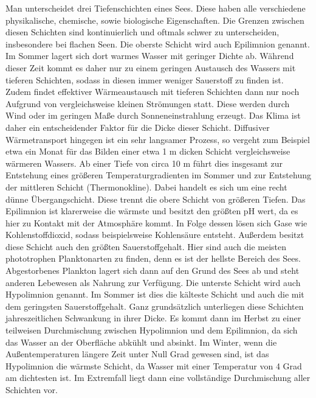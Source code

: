\documentclass[12pt,a4paper,titlepage,headinclude,bibtotoc]{scrartcl}
\begin{document}
Man unterscheidet drei Tiefenschichten eines Sees.
Diese haben alle verschiedene physikalische, chemische, sowie biologische Eigenschaften. Die Grenzen zwischen diesen Schichten sind kontinuierlich und oftmals schwer zu unterscheiden, insbesondere bei flachen Seen.
Die oberste Schicht wird auch Epilimnion genannt. 
Im Sommer lagert sich dort warmes Wasser mit geringer Dichte ab.
Während dieser Zeit kommt es daher nur zu einem geringen Austausch des Wassers
mit tieferen Schichten, sodass in diesen immer weniger Sauerstoff zu finden ist.
Zudem findet effektiver Wärmeaustausch mit tieferen Schichten dann nur noch Aufgrund von vergleichsweise
kleinen Strömungen statt. Diese werden durch Wind oder im geringen Maße durch Sonneneinstrahlung erzeugt. 
Das Klima ist daher ein entscheidender Faktor für die Dicke dieser Schicht.
Diffusiver Wärmetransport hingegen ist ein sehr langsamer
Prozess, so vergeht zum Beispiel etwa ein Monat für das Bilden einer etwa 1 m dicken Schicht vergleichsweise wärmeren Wassers.
Ab einer Tiefe von circa 10 m führt dies insgesamt zur Entstehung eines größeren Temperaturgradienten im Sommer und 
zur Entstehung der mittleren Schicht (Thermonokline). Dabei handelt es sich um eine recht dünne  Übergangschicht. Diese trennt die obere Schicht von größeren Tiefen. 
\cite{schicht}
\newline
Das Epilimnion  ist klarerweise die wärmste und besitzt den größten pH wert, da es hier zu Kontakt mit der Atmosphäre kommt. In Folge dessen lösen sich Gase wie Kohlenstoffdioxid, sodass beispielsweise Kohlensäure entsteht. Außerdem besitzt diese Schicht auch den größten Sauerstoffgehalt. Hier sind auch die meisten phototrophen Planktonarten zu finden, denn es ist der hellste Bereich des Sees. Abgestorbenes Plankton lagert sich dann auf den Grund des Sees ab und steht anderen Lebewesen als Nahrung zur Verfügung.
\newline
Die unterste Schicht wird auch Hypolimnion genannt.
Im Sommer ist dies die kälteste Schicht und auch die mit dem geringsten Sauerstoffgehalt. 
Ganz grundsätzlich unterliegen diese Schichten jahreszeitlichen Schwankung in ihrer Dicke.
Es kommt dann im Herbst zu einer teilweisen Durchmischung zwischen Hypolimnion und dem Epilimnion, da sich das Wasser an der Oberfläche abkühlt und absinkt.
Im Winter, wenn die Außentemperaturen längere Zeit unter Null Grad gewesen sind, ist das Hypolimnion die wärmste Schicht, da Wasser mit einer Temperatur von 4 Grad am dichtesten ist. 
Im Extremfall liegt dann eine vollständige Durchmischung aller Schichten vor.
\end{document}
